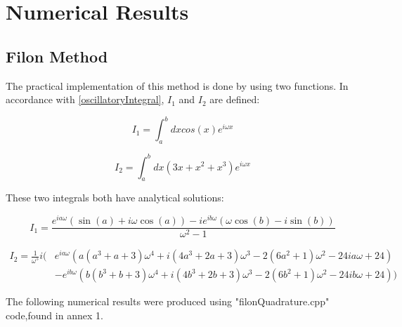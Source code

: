 \chapter{Numerical Results}

\section{Filon Method}

The practical implementation of this method is done by using two functions. In accordance with \eqref{oscillatoryIntegral}, $I_1$ and $I_2$ are defined:


\begin{equation}
      I_1=\int_a^{b}dx cos(x)e^{i\omega x}
\end{equation}

\begin{equation}
      I_2 =\int_a^{b}dx (3x+x^2+x^3)e^{i\omega x} 
\end{equation}

These two integrals both have analytical solutions:

\begin{equation}
  I_1=\frac{e^{i a \omega } (\sin (a)+i \omega  \cos (a))-i e^{i b \omega } (\omega  \cos (b)-i \sin (b))}{\omega ^2-1}
\end{equation}

\begin{equation}
  \begin{aligned}
    I_2=\frac{1}{\omega^5}i (&e^{i a \omega } (a (a^3+a+3) \omega ^4+i (4 a^3+2 a+3) \omega ^3-2 (6 a^2+1) \omega ^2-24 i a \omega +24)\\
                             &-e^{i b \omega } (b (b^3+b+3) \omega ^4+i (4 b^3+2 b+3) \omega ^3-2 (6 b^2+1) \omega ^2-24 i b \omega +24))
  \end{aligned}
\end{equation}

The following numerical results were produced using "filonQuadrature.cpp" code,found in annex 1.



